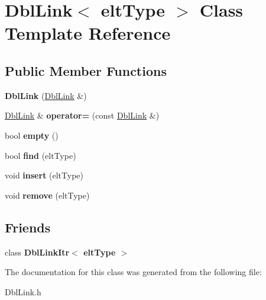 \hypertarget{classDblLink}{\section{Dbl\-Link$<$ elt\-Type $>$ Class Template Reference}
\label{classDblLink}
}
\subsection*{Public Member Functions}
\begin{DoxyCompactItemize}
\item 
\hypertarget{classDblLink_a6ec142fb189ce28f3470662d7816323c}{{\bfseries Dbl\-Link} (\hyperlink{classDblLink}{Dbl\-Link} \&)}\label{classDblLink_a6ec142fb189ce28f3470662d7816323c}

\item 
\hypertarget{classDblLink_a4ad84478d74adf66e4e8b33a790135b8}{\hyperlink{classDblLink}{Dbl\-Link} \& {\bfseries operator=} (const \hyperlink{classDblLink}{Dbl\-Link} \&)}\label{classDblLink_a4ad84478d74adf66e4e8b33a790135b8}

\item 
\hypertarget{classDblLink_ad9ccf7ec9384507dc3092d1747d8856b}{bool {\bfseries empty} ()}\label{classDblLink_ad9ccf7ec9384507dc3092d1747d8856b}

\item 
\hypertarget{classDblLink_a7b67d68277006dbb3f17eacd66f1bc5f}{bool {\bfseries find} (elt\-Type)}\label{classDblLink_a7b67d68277006dbb3f17eacd66f1bc5f}

\item 
\hypertarget{classDblLink_a1eea642e9114517a9b8976bec5108612}{void {\bfseries insert} (elt\-Type)}\label{classDblLink_a1eea642e9114517a9b8976bec5108612}

\item 
\hypertarget{classDblLink_a9dee7a88fd268b8c587a6df95b4eab03}{void {\bfseries remove} (elt\-Type)}\label{classDblLink_a9dee7a88fd268b8c587a6df95b4eab03}

\end{DoxyCompactItemize}
\subsection*{Friends}
\begin{DoxyCompactItemize}
\item 
\hypertarget{classDblLink_a15e9b1e37fae72414617320686b8b4f0}{class {\bfseries Dbl\-Link\-Itr$<$ elt\-Type $>$}}\label{classDblLink_a15e9b1e37fae72414617320686b8b4f0}

\end{DoxyCompactItemize}


The documentation for this class was generated from the following file\-:\begin{DoxyCompactItemize}
\item 
Dbl\-Link.\-h\end{DoxyCompactItemize}
